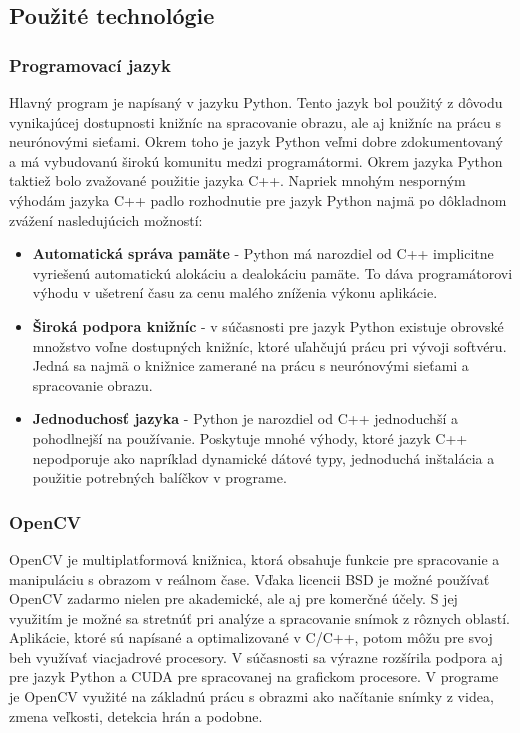 \documentclass[slovak,master,dept460,male,cpp,cpdeclaration]{diploma}
\begin{document}
\newpage
\subsection{Použité technológie}

\subsubsection*{Programovací jazyk}
Hlavný program je napísaný v jazyku Python. Tento jazyk bol použitý z dôvodu vynikajúcej dostupnosti knižníc na spracovanie obrazu, ale aj knižníc na prácu s neurónovými sieťami. Okrem toho je jazyk Python veľmi dobre zdokumentovaný a má vybudovanú širokú komunitu medzi programátormi. Okrem jazyka Python taktiež bolo zvažované použitie jazyka C++.  Napriek mnohým nesporným výhodám jazyka C++ padlo rozhodnutie pre jazyk Python najmä po dôkladnom zvážení nasledujúcich možností:
\begin{itemize}
\item \textbf{Automatická správa pamäte} - Python má narozdiel od C++  implicitne  vyriešenú automatickú alokáciu a dealokáciu pamäte. To dáva programátorovi výhodu v ušetrení času za cenu malého zníženia výkonu aplikácie.
\item \textbf{Široká podpora knižníc} - v súčasnosti pre jazyk Python existuje obrovské množstvo voľne dostupných knižníc, ktoré uľahčujú prácu pri vývoji softvéru. Jedná sa najmä o knižnice zamerané na prácu s neurónovými sieťami a spracovanie obrazu.
\item \textbf{Jednoduchosť jazyka} - Python je narozdiel od C++ jednoduchší a pohodlnejší  na používanie. Poskytuje mnohé výhody, ktoré jazyk C++ nepodporuje ako napríklad dynamické dátové typy, jednoduchá inštalácia a použitie potrebných balíčkov v programe.
\end{itemize}

\subsubsection*{OpenCV}
OpenCV je multiplatformová knižnica, ktorá obsahuje funkcie pre spracovanie a manipuláciu s obrazom v reálnom čase. Vďaka licencii BSD je možné používať OpenCV zadarmo  nielen pre akademické, ale aj pre komerčné účely. S jej využitím je možné sa stretnúť pri analýze a spracovanie snímok z rôznych oblastí. Aplikácie, ktoré sú napísané a optimalizované v C/C++, potom môžu pre svoj beh využívať viacjadrové procesory. V súčasnosti sa výrazne rozšírila podpora aj pre jazyk Python a CUDA pre spracovanej na grafickom procesore. V programe je OpenCV využité  na základnú prácu s obrazmi ako načítanie snímky z videa, zmena veľkosti, detekcia hrán a podobne.
\end{document}
